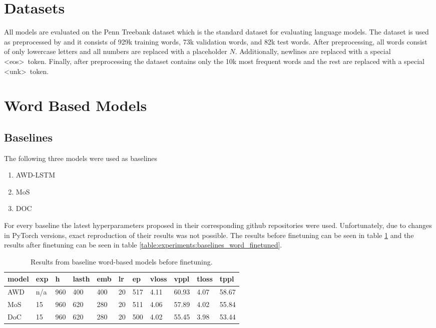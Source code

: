\section{Datasets}
All models are evaluated on the Penn Treebank dataset which is the standard dataset for evaluating language models. The dataset is used as preprocessed by \citet{mikolov2011empirical} and it consists of 929k training words, 73k validation words, and 82k test words. After preprocessing, all words consist of only lowercase letters and all numbers are replaced with a placeholder $ N $. Additionally, newlines are replaced with a special \textless eos\textgreater \ token. Finally, after preprocessing the dataset contains only the 10k most frequent words and the rest are replaced with a special \textless unk\textgreater \ token.

\section{Word Based Models}

\subsection{Baselines}

The following three models were used as baselines

\begin{enumerate}
    \item AWD-LSTM \citep{merity2017regularizing}
    \item MoS \citep{yang2017breaking}
    \item DOC \citep{takase2018direct}
\end{enumerate}

For every baseline the latest hyperparameters proposed in their corresponding github repositories were used. Unfortunately, due to changes in PyTorch versions, exact reproduction of their results was not possible. The results before finetuning can be seen in table \ref{table:experiments:baselines_word} and the results after finetuning can be seen in table \ref{table:experiments:baselines_word_finetuned}.

\begin{table}[]
\caption{Results from baseline word-based models before finetuning.}
\begin{tabular}{|l|l|l|l|l|l|l|l|l|l|l|}
\hline
\textbf{model}    & \textbf{exp} & \textbf{h}   & \textbf{lasth} & \textbf{emb} & \textbf{lr} & \textbf{ep}  & \textbf{vloss} & \textbf{vppl}  & \textbf{tloss} & \textbf{tppl}  \\ \hline
AWD      & n/a & 960 & 400   & 400 & 20 & 517 & 4.11  & 60.93 & 4.07  & 58.67 \\ \hline
MoS      & 15  & 960 & 620   & 280 & 20 & 511 & 4.06  & 57.89 & 4.02  & 55.84 \\ \hline
DoC      & 15  & 960 & 620   & 280 & 20 & 500 & 4.02  & 55.45 & 3.98  & 53.44 \\ \hline
\end{tabular}
\label{table:experiments:baselines_word}
\end{table}

